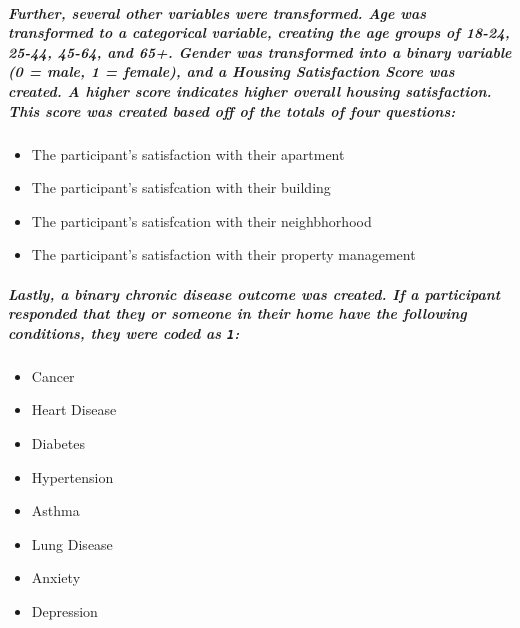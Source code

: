 \documentclass[]{article}
\providecommand{\tightlist}{%
  \setlength{\itemsep}{0pt}\setlength{\parskip}{0pt}}
\let\oldsubparagraph\subparagraph
\renewcommand{\subparagraph}[1]{\oldsubparagraph{#1}\mbox{}}
\begin{document}
\hypertarget{further-several-other-variables-were-transformed.-age-was-transformed-to-a-categorical-variable-creating-the-age-groups-of-18-24-25-44-45-64-and-65.-gender-was-transformed-into-a-binary-variable-0-male-1-female-and-a-housing-satisfaction-score-was-created.-a-higher-score-indicates-higher-overall-housing-satisfaction.-this-score-was-created-based-off-of-the-totals-of-four-questions}{%
\subparagraph{Further, several other variables were transformed. Age was
transformed to a categorical variable, creating the age groups of 18-24,
25-44, 45-64, and 65+. Gender was transformed into a binary variable (0
= male, 1 = female), and a Housing Satisfaction Score was created. A
higher score indicates higher overall housing satisfaction. This score
was created based off of the totals of four
questions:}\label{further-several-other-variables-were-transformed.-age-was-transformed-to-a-categorical-variable-creating-the-age-groups-of-18-24-25-44-45-64-and-65.-gender-was-transformed-into-a-binary-variable-0-male-1-female-and-a-housing-satisfaction-score-was-created.-a-higher-score-indicates-higher-overall-housing-satisfaction.-this-score-was-created-based-off-of-the-totals-of-four-questions}}

\begin{itemize}
\tightlist
\item
  The participant's satisfaction with their apartment
\item
  The participant's satisfcation with their building
\item
  The participant's satisfcation with their neighbhorhood
\item
  The participant's satisfaction with their property management
\end{itemize}

\hypertarget{lastly-a-binary-chronic-disease-outcome-was-created.-if-a-participant-responded-that-they-or-someone-in-their-home-have-the-following-conditions-they-were-coded-as-1}{%
\subparagraph{\texorpdfstring{Lastly, a binary chronic disease outcome
was created. If a participant responded that they or someone in their
home have the following conditions, they were coded as
\texttt{1}:}{Lastly, a binary chronic disease outcome was created. If a participant responded that they or someone in their home have the following conditions, they were coded as 1:}}\label{lastly-a-binary-chronic-disease-outcome-was-created.-if-a-participant-responded-that-they-or-someone-in-their-home-have-the-following-conditions-they-were-coded-as-1}}

\begin{itemize}
\tightlist
\item
  Cancer
\item
  Heart Disease
\item
  Diabetes
\item
  Hypertension
\item
  Asthma
\item
  Lung Disease
\item
  Anxiety
\item
  Depression
\end{itemize}
\end{document}
